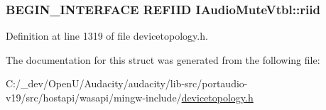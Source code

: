 \subsubsection[{\texorpdfstring{riid}{riid}}]{\setlength{\rightskip}{0pt plus 5cm}B\+E\+G\+I\+N\+\_\+\+I\+N\+T\+E\+R\+F\+A\+CE {\bf R\+E\+F\+I\+ID} I\+Audio\+Mute\+Vtbl\+::riid}\hypertarget{struct_i_audio_mute_vtbl_ab49d6ef38a02d4f0b3896f42b61bf6ae}{}\label{struct_i_audio_mute_vtbl_ab49d6ef38a02d4f0b3896f42b61bf6ae}


Definition at line 1319 of file devicetopology.\+h.



The documentation for this struct was generated from the following file\+:\begin{DoxyCompactItemize}
\item 
C\+:/\+\_\+dev/\+Open\+U/\+Audacity/audacity/lib-\/src/portaudio-\/v19/src/hostapi/wasapi/mingw-\/include/\hyperlink{devicetopology_8h}{devicetopology.\+h}\end{DoxyCompactItemize}
